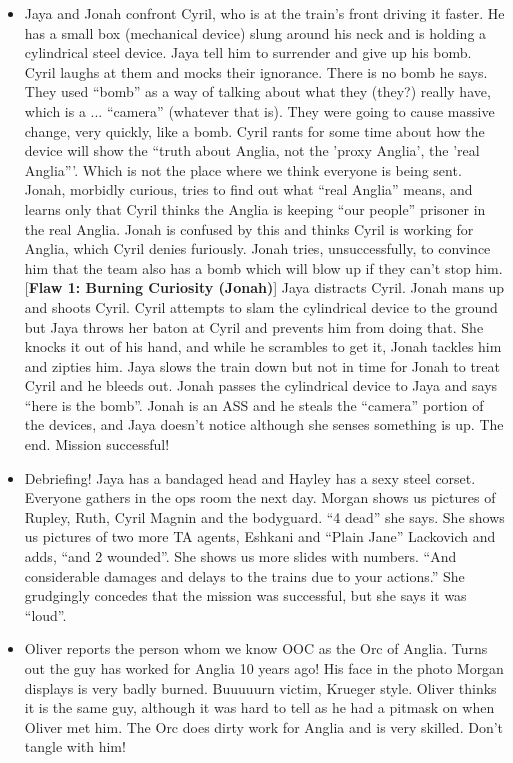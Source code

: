\begin{itemize}
\item Jaya and Jonah confront Cyril, who is at the train's front driving it faster.  He has a small box (mechanical device) slung around his neck and is holding a cylindrical steel device.  Jaya tell him to surrender and give up his bomb.  Cyril laughs at them and mocks their ignorance.  There is no bomb he says.  They used ``bomb'' as a way of talking about what they (they?) really have, which is a ... ``camera'' (whatever that is).  They were going to cause massive change, very quickly, like a bomb.  Cyril rants for some time about how the device will show the ``truth about Anglia, not the 'proxy Anglia', the 'real Anglia'''.  Which is not the place where we think everyone is being sent.  Jonah, morbidly curious, tries to find out what ``real Anglia'' means, and learns only that Cyril thinks the Anglia is keeping ``our people'' prisoner in the real Anglia.  Jonah is confused by this and thinks Cyril is working for Anglia, which Cyril denies furiously.  Jonah tries, unsuccessfully,  to convince him that the team also has a bomb which will blow up if they can't stop him.  {[}\textbf{Flaw 1: Burning Curiosity (Jonah)}{]}  Jaya distracts Cyril.   Jonah mans up and shoots Cyril.  Cyril attempts to slam the cylindrical device to the ground but Jaya throws her baton at Cyril and prevents him from doing that.  She knocks it out of his hand, and while he scrambles to get it, Jonah tackles him and zipties him. Jaya slows the train down but not in time for Jonah to treat Cyril and he bleeds out.   Jonah passes the cylindrical device to Jaya and says ``here is the bomb''.  Jonah is an ASS and he steals the ``camera'' portion of the devices, and Jaya doesn't notice although she senses something is up.  The end.  Mission successful!
\item Debriefing!  Jaya has a bandaged head and Hayley has a sexy steel corset.  Everyone gathers in the ops room the next day.    Morgan shows us pictures of Rupley, Ruth, Cyril Magnin and the bodyguard.  ``4 dead'' she says.  She shows us pictures of two more TA agents, Eshkani and ``Plain Jane'' Lackovich and adds, ``and 2 wounded''.  She shows us more slides with numbers.  ``And considerable damages and delays to the trains due to your actions.''  She grudgingly concedes that the mission was successful, but she says it was ``loud''.  
\item Oliver reports the person whom we know OOC as the Orc of Anglia.  Turns out the guy has worked for Anglia 10 years ago!  His face in the photo Morgan displays is very badly burned.  Buuuuurn victim, Krueger style.  Oliver thinks it is the same guy, although it was hard to tell as he had a pitmask on when Oliver met him.  The Orc does dirty work for Anglia and is very skilled. Don't tangle with him!

\end{itemize}
